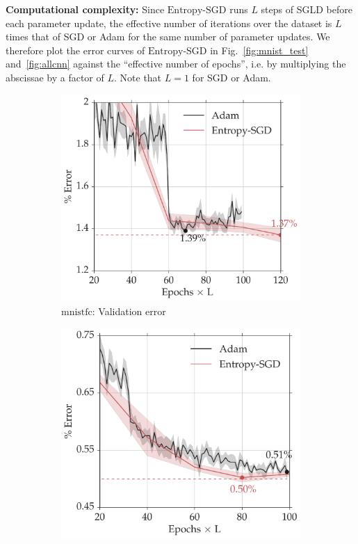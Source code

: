 \documentclass[10pt]{article}
\newcommand{\entropysgd}{\mathrm{Entropy}\textrm{-}\mathrm{SGD}}
\newcommand{\mnistfc}{\textrm{mnistfc}}
\begin{document}
\textbf{Computational complexity:} Since $\entropysgd$ runs $L$ steps of SGLD before each parameter update, the effective number of iterations over the dataset is $L$ times that of SGD or Adam for the same number of parameter updates. We therefore plot the error curves of $\entropysgd$ in Fig.~\ref{fig:mnist_test} and~\ref{fig:allcnn} against the ``effective number of epochs'', i.e. by multiplying the abscissae by a factor of $L$. Note that $L = 1$ for SGD or Adam.

\begin{figure}[htp!]
\centering
    \begin{subfigure}[t]{0.4\textwidth}
        \centering
        \includegraphics[width=\textwidth]{mnistfc_valid.pdf}
        \caption{\small $\mnistfc$: Validation error}
        \label{fig:mnistfc_test}
    \end{subfigure}
    \hspace{0.2in}
    \begin{subfigure}[t]{0.4\textwidth}
        \centering
        \includegraphics[width=\textwidth]{lenet_valid.pdf}

\end{subfigure}
\end{figure}
\end{document}
